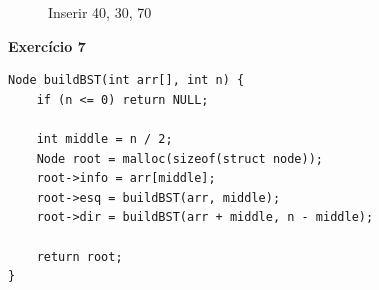 \documentclass[a4paper,11pt]{article}
\begin{document}
\begin{figure}[H]
\begin{minipage}{0.49\textwidth}
		\caption{Inserir 40, 30, 70}
	\end{minipage}
\end{figure}

\newpage

\noindent \textbf{Exercício 7}
	
\begin{verbatim}
Node buildBST(int arr[], int n) {
	if (n <= 0) return NULL;
	
	int middle = n / 2;
	Node root = malloc(sizeof(struct node));
	root->info = arr[middle];
	root->esq = buildBST(arr, middle);
	root->dir = buildBST(arr + middle, n - middle);
	
	return root;
}
\end{verbatim}
\end{document}
